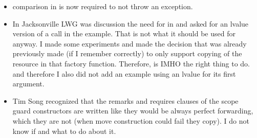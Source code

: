 \documentclass[ebook,11pt,article]{memoir}
\begin{document}
\begin{itemize}
\item comparison in  is now required to not throw an exception.
\item In Jacksonville LWG was discussion the need for  in  and asked for an lvalue version of a call in the example. That is not what it should be used for anyway. I made some experiments and made the decision that was already previously made (if I remember correctly) to only support copying of the resource in that factory function. Therefore,  is IMHO the right thing to do. and therefore I also did not add an example using an lvalue for its first argument.
\item Tim Song recognized that the remarks and requires clauses of the scope guard constructors are written like they would be always perfect forwarding, which they are not (when move construction could fail they copy). I do not know if and what to do about it. 
\end{itemize}
\end{document}
